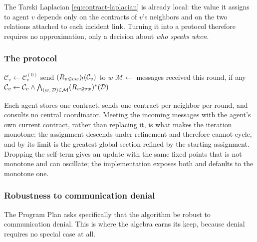 \documentclass[11pt]{article}
\newcommand{\meet}{\wedge}
\newcommand{\face}{\trianglelefteqslant}
\theoremstyle{definition}
\theoremstyle{remark}
\begin{document}
The Tarski Laplacian \eqref{eq:contract-laplacian} is already local: the value it assigns to
agent $v$ depends only on the contracts of $v$'s neighbors and on the two relations attached to
each incident link.
Turning it into a protocol therefore requires no approximation, only a decision about
\emph{who speaks when}.

\subsubsection{The protocol}

\begin{algorithm}[h]
\caption{Decentralized contract resolution, as run by agent $v$}
\label{alg:protocol}
\begin{algorithmic}[1]
\State $\mathcal{C}_v \gets \mathcal{C}_v^{(0)}$ 
      \State send $(R_{v \face vw})_!(\mathcal{C}_v)$ to $w$
    \EndFor
  \EndIf
  \State $\mathcal{M} \gets$ messages received this round, if any
  \State $\mathcal{C}_v \gets \mathcal{C}_v \meet
         \bigwedge_{(w,\,\mathcal{D}) \in \mathcal{M}}
         (R_{v \face vw})^{*}(\mathcal{D})$
\EndFor
\end{algorithmic}
\end{algorithm}

Each agent stores one contract, sends one contract per neighbor per round, and consults no
central coordinator.
Meeting the incoming messages with the agent's own current contract, rather than replacing it,
is what makes the iteration monotone: the assignment descends under refinement and therefore
cannot cycle, and by  its limit is the greatest global section refined by
the starting assignment.
Dropping the self-term gives an update with the same fixed points that is not monotone and can
oscillate; the implementation exposes both and defaults to the monotone one.

\subsubsection{Robustness to communication denial}

The Program Plan asks specifically that the algorithm be robust to communication denial.
This is where the algebra earns its keep, because denial requires no special case at all.
\end{document}
